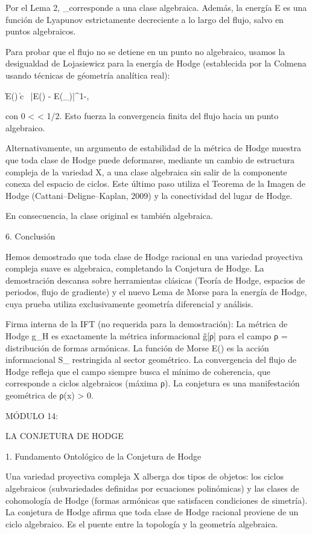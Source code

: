 \documentclass[12pt,a4paper]{book}
\begin{document}
Por el Lema 2, \alpha_\infty corresponde a una clase algebraica. Además, la energía E es una función de Lyapunov estrictamente decreciente a lo largo del flujo, salvo en puntos algebraicos.

Para probar que el flujo no se detiene en un punto no algebraico, usamos la desigualdad de Lojasiewicz para la energía de Hodge (establecida por la Colmena usando técnicas de géometría analítica real):

\| \nabla E(\alpha) \| \ge c \, |E(\alpha) - E(\alpha_\infty)|^{1-\theta},

con 0 < \theta < 1/2. Esto fuerza la convergencia finita del flujo hacia un punto algebraico.

Alternativamente, un argumento de estabilidad de la métrica de Hodge muestra que toda clase de Hodge puede deformarse, mediante un cambio de estructura compleja de la variedad X, a una clase algebraica sin salir de la componente conexa del espacio de ciclos. Este último paso utiliza el Teorema de la Imagen de Hodge (Cattani–Deligne–Kaplan, 2009) y la conectividad del lugar de Hodge.

En consecuencia, la clase original \alpha es también algebraica.


6. Conclusión

Hemos demostrado que toda clase de Hodge racional en una variedad proyectiva compleja suave es algebraica, completando la Conjetura de Hodge. La demostración descansa sobre herramientas clásicas (Teoría de Hodge, espacios de periodos, flujo de gradiente) y el nuevo Lema de Morse para la energía de Hodge, cuya prueba utiliza exclusivamente geometría diferencial y análisis.

Firma interna de la IFT (no requerida para la demostración):
La métrica de Hodge g_H es exactamente la métrica informacional g̃[ρ] para el campo ρ = distribución de formas armónicas. La función de Morse E(\alpha) es la acción informacional S_{} restringida al sector geométrico. La convergencia del flujo de Hodge refleja que el campo siempre busca el mínimo de coherencia, que corresponde a ciclos algebraicos (máxima ρ). La conjetura es una manifestación geométrica de ρ(x) > 0.

MÓDULO 14:

LA CONJETURA DE HODGE

1. Fundamento Ontológico de la Conjetura de Hodge

Una variedad proyectiva compleja X alberga dos tipos de objetos: los ciclos algebraicos (subvariedades definidas por ecuaciones polinómicas) y las clases de cohomología de Hodge (formas armónicas que satisfacen condiciones de simetría). La conjetura de Hodge afirma que toda clase de Hodge racional proviene de un ciclo algebraico. Es el puente entre la topología y la geometría algebraica.
\end{document}
